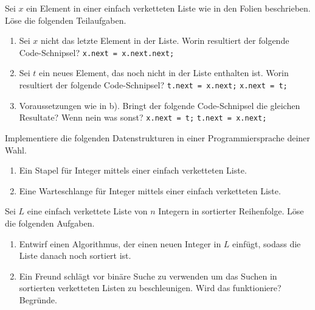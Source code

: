 \documentclass{uebung_cs}
\begin{document}
\begin{aufgabe}
	Sei $x$ ein Element in einer einfach verketteten Liste wie in den Folien beschrieben.
	Löse die folgenden Teilaufgaben.
	\begin{enumerate}
		\item Sei $x$ nicht das letzte Element in der Liste.
		Worin resultiert der folgende Code-Schnipsel?
		\hspace*{20pt}\texttt{x.next = x.next.next;}

		\item Sei $t$ ein neues Element, das noch nicht in der Liste enthalten ist.
		Worin resultiert der folgende Code-Schnipsel?
		\hspace*{20pt}\texttt{t.next = x.next;}
		\hspace*{20pt}\texttt{x.next = t;}

		\item Voraussetzungen wie in b).
		Bringt der folgende Code-Schnipsel die gleichen Resultate?
		Wenn nein was sonst?
		\hspace*{20pt}\texttt{x.next = t;}
		\hspace*{20pt}\texttt{t.next = x.next;}
	\end{enumerate}
\end{aufgabe}

\begin{aufgabe}
	Implementiere die folgenden Datenstrukturen in einer Programmiersprache deiner Wahl.
	\begin{enumerate}
		\item Ein Stapel für Integer mittels einer einfach verketteten Liste.
		\item Eine Warteschlange für Integer mittels einer einfach verketteten Liste.
	\end{enumerate}
\end{aufgabe}

\begin{aufgabe}
	Sei $L$ eine einfach verkettete Liste von $n$ Integern in sortierter Reihenfolge.
	Löse die folgenden Aufgaben.
	\begin{enumerate}
		\item Entwirf einen Algorithmus, der einen neuen Integer in $L$ einfügt, sodass die Liste danach noch sortiert ist.
		\item Ein Freund schlägt vor binäre Suche zu verwenden um das Suchen in sortierten verketteten Listen zu beschleunigen. Wird das funktioniere? Begründe.
	\end{enumerate}
\end{aufgabe}
\end{document}

